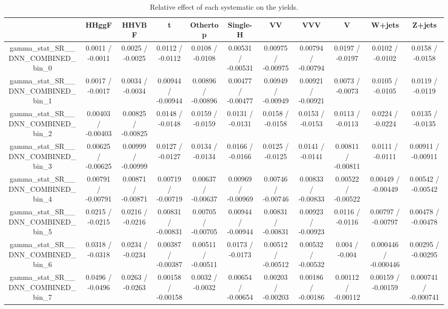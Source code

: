 \documentclass[10pt]{article}
\begin{document}
\begin{table}[htbp]
\begin{center}
\begin{tabular}{|c|c|c|c|c|c|c|c|c|c|c|}
\hline 
      & HHggF      & HHVBF      & t      & Othertop      & Single-H      & VV      & VVV      & V      & W+jets      & Z+jets \\ 
\hline 
  gamma_stat_SR__DNN_COMBINED_bin_0 & 0.0011 / -0.0011 & 0.0025 / -0.0025 & 0.0112 / -0.0112 & 0.0108 / -0.0108 & 0.00531 / -0.00531 & 0.00975 / -0.00975 & 0.00794 / -0.00794 & 0.0197 / -0.0197 & 0.0102 / -0.0102 & 0.0158 / -0.0158 \\ 
  gamma_stat_SR__DNN_COMBINED_bin_1 & 0.0017 / -0.0017 & 0.0034 / -0.0034 & 0.00944 / -0.00944 & 0.00896 / -0.00896 & 0.00477 / -0.00477 & 0.00949 / -0.00949 & 0.00921 / -0.00921 & 0.0073 / -0.0073 & 0.0105 / -0.0105 & 0.0119 / -0.0119 \\ 
  gamma_stat_SR__DNN_COMBINED_bin_2 & 0.00403 / -0.00403 & 0.00825 / -0.00825 & 0.0148 / -0.0148 & 0.0159 / -0.0159 & 0.0131 / -0.0131 & 0.0158 / -0.0158 & 0.0153 / -0.0153 & 0.0113 / -0.0113 & 0.0224 / -0.0224 & 0.0135 / -0.0135 \\ 
  gamma_stat_SR__DNN_COMBINED_bin_3 & 0.00625 / -0.00625 & 0.00999 / -0.00999 & 0.0127 / -0.0127 & 0.0134 / -0.0134 & 0.0166 / -0.0166 & 0.0125 / -0.0125 & 0.0141 / -0.0141 & 0.00811 / -0.00811 & 0.0111 / -0.0111 & 0.00911 / -0.00911 \\ 
  gamma_stat_SR__DNN_COMBINED_bin_4 & 0.00791 / -0.00791 & 0.00871 / -0.00871 & 0.00719 / -0.00719 & 0.00637 / -0.00637 & 0.00969 / -0.00969 & 0.00746 / -0.00746 & 0.00833 / -0.00833 & 0.00522 / -0.00522 & 0.00449 / -0.00449 & 0.00542 / -0.00542 \\ 
  gamma_stat_SR__DNN_COMBINED_bin_5 & 0.0215 / -0.0215 & 0.0216 / -0.0216 & 0.00831 / -0.00831 & 0.00705 / -0.00705 & 0.00944 / -0.00944 & 0.00831 / -0.00831 & 0.00923 / -0.00923 & 0.0116 / -0.0116 & 0.00797 / -0.00797 & 0.00478 / -0.00478 \\ 
  gamma_stat_SR__DNN_COMBINED_bin_6 & 0.0318 / -0.0318 & 0.0234 / -0.0234 & 0.00387 / -0.00387 & 0.00511 / -0.00511 & 0.0173 / -0.0173 & 0.00512 / -0.00512 & 0.00532 / -0.00532 & 0.004 / -0.004 & 0.000446 / -0.000446 & 0.00295 / -0.00295 \\ 
  gamma_stat_SR__DNN_COMBINED_bin_7 & 0.0496 / -0.0496 & 0.0263 / -0.0263 & 0.00158 / -0.00158 & 0.0032 / -0.0032 & 0.00654 / -0.00654 & 0.00203 / -0.00203 & 0.00186 / -0.00186 & 0.00112 / -0.00112 & 0.00159 / -0.00159 & 0.000741 / -0.000741 \\ 
\hline 
\end{tabular} 
\caption{Relative effect of each systematic on the yields.} 
\end{center} 
\end{table} 
\end{document}
